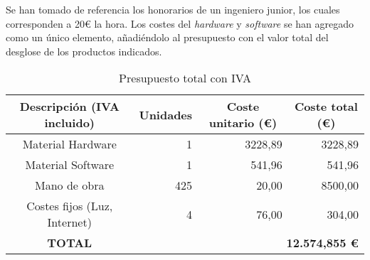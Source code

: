 \vspace{0.5cm}

Se han tomado de referencia los honorarios de un ingeniero junior, los cuales corresponden a 20€ la hora. Los costes del \textit{hardware} y \textit{software} se han agregado como un único elemento, añadiéndolo al presupuesto con el valor total del desglose de los productos indicados.

\vspace{0.5cm}

\begin{table}[ht]
	\centering
	\begin{tabular}{|c|r|r|r|}
		\hline
		\rowcolor[HTML]{EFEFEF}
		\textbf{Descripción (IVA incluido)} & \multicolumn{1}{c|}{\cellcolor[HTML]{EFEFEF}\textbf{Unidades}}     & \multicolumn{1}{c|}{\cellcolor[HTML]{EFEFEF}\textbf{Coste unitario (€)}} & \multicolumn{1}{c|}{\cellcolor[HTML]{EFEFEF}\textbf{Coste total (€)}} \\ \hline
		Material Hardware                   & 1                                                                  & 3228,89                                                                  & 3228,89                                                               \\ \hline
		Material Software                   & 1                                                                  & 541,96                                                                   & 541,96                                                                \\ \hline
		Mano de obra                        & 425                                                                & 20,00                                                                    & 8500,00                                                               \\ \hline
		Costes fijos (Luz, Internet)        & 4                                                                  & 76,00                                                                    & 304,00                                                                \\ \hline
		\rowcolor[HTML]{FFFFC7}
		\textbf{TOTAL}                      & \multicolumn{3}{r|}{\cellcolor[HTML]{FFFFC7}\textbf{12.574,85‬‬5 €‬}}                                                                                                                                                    \\ \hline
	\end{tabular}
	\caption{Presupuesto total con IVA}
	\label{tab:budget}
\end{table}